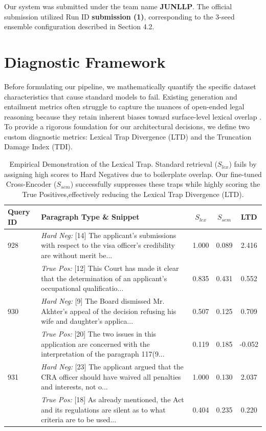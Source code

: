 \documentclass[sigconf]{acmart}
\newcommand{\rev}[1]{{\color{blue}#1}}
\begin{document}
\rev{Our system was submitted under the team name \textbf{JUNLLP}. The official submission utilized Run ID \textbf{submission (1)}, corresponding to the 3-seed ensemble configuration described in Section 4.2.}

\section{Diagnostic Framework}

Before formulating our pipeline, we mathematically quantify the specific dataset characteristics that cause standard models to fail. Existing generation and entailment metrics often struggle to capture the nuances of open-ended legal reasoning because they retain inherent biases toward surface-level lexical overlap \cite{mccoy2019right}. To provide a rigorous foundation for our architectural decisions, we define two custom diagnostic metrics: Lexical Trap Divergence (LTD) and the Truncation Damage Index (TDI).

\begin{table}[t]
  \caption{Empirical Demonstration of the Lexical Trap. Standard retrieval ($S_{lex}$) fails by assigning high scores to Hard Negatives due to boilerplate overlap. Our fine-tuned Cross-Encoder ($S_{sem}$) successfully suppresses these traps while highly scoring the True Positives,effectively reducing the Lexical Trap Divergence (LTD).}
  \label{tab:ltd_evidence}
  \small
  \begin{tabular}{p{1.5cm} p{10cm} c c c}
    \toprule
    \textbf{Query ID} & \textbf{Paragraph Type \& Snippet} & \textbf{$S_{lex}$} & \textbf{$S_{sem}$} & \textbf{LTD}\\
    \midrule
    928 & \textit{Hard Neg:} [14] The applicant's submissions with respect to the visa officer's credibility are without merit be... & 1.000 & 0.089 & 2.416 \\
         & \textit{True Pos:} [12] This Court has made it clear that the determination of an applicant's occupational qualificatio... & 0.835 & 0.431 & 0.552 \\
    \midrule
    930 & \textit{Hard Neg:} [9] The Board dismissed Mr. Akhter's appeal of the decision refusing his wife and daughter's applica... & 0.507 & 0.125 & 0.709 \\
         & \textit{True Pos:} [20] The two issues in this application are concerned with the interpretation of the paragraph 117(9... & 0.119 & 0.185 & -0.052 \\
    \midrule
    931 & \textit{Hard Neg:} [23] The applicant argued that the CRA officer should have waived all penalties and interests, not o... & 1.000 & 0.130 & 2.037 \\
         & \textit{True Pos:} [18] As already mentioned, the Act and its regulations are silent as to what criteria are to be used... & 0.404 & 0.235 & 0.220 \\
    \bottomrule
  \end{tabular}
\end{table}
\end{document}
